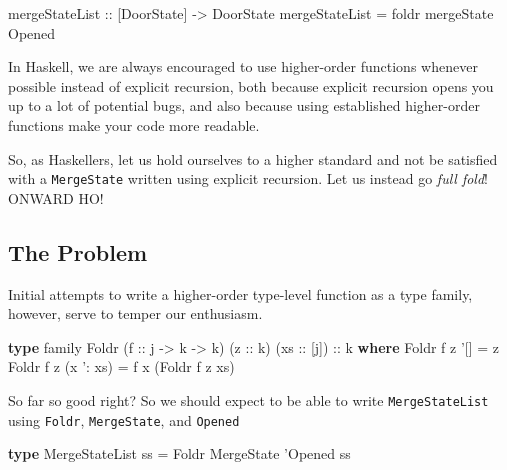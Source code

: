 \documentclass[]{article}
\newenvironment{Shaded}{}{}
\newcommand{\DataTypeTok}[1]{\textcolor[rgb]{0.56,0.13,0.00}{#1}}
\newcommand{\FunctionTok}[1]{\textcolor[rgb]{0.02,0.16,0.49}{#1}}
\newcommand{\KeywordTok}[1]{\textcolor[rgb]{0.00,0.44,0.13}{\textbf{#1}}}
\newcommand{\NormalTok}[1]{#1}
\newcommand{\OtherTok}[1]{\textcolor[rgb]{0.00,0.44,0.13}{#1}}
\begin{document}
\begin{Shaded}
\begin{Highlighting}[]
\OtherTok{mergeStateList ::}\NormalTok{ [}\DataTypeTok{DoorState}\NormalTok{] }\OtherTok{->} \DataTypeTok{DoorState}
\NormalTok{mergeStateList }\FunctionTok{=}\NormalTok{ foldr mergeState }\DataTypeTok{Opened}
\end{Highlighting}
\end{Shaded}

In Haskell, we are always encouraged to use higher-order functions whenever
possible instead of explicit recursion, both because explicit recursion opens
you up to a lot of potential bugs, and also because using established
higher-order functions make your code more readable.

So, as Haskellers, let us hold ourselves to a higher standard and not be
satisfied with a \texttt{MergeState} written using explicit recursion. Let us
instead go \emph{full fold}! ONWARD HO!

\hypertarget{the-problem}{%
\subsection{The Problem}\label{the-problem}}

Initial attempts to write a higher-order type-level function as a type family,
however, serve to temper our enthusiasm.

\begin{Shaded}
\begin{Highlighting}[]
\KeywordTok{type}\NormalTok{ family }\DataTypeTok{Foldr}\NormalTok{ (}\OtherTok{f ::}\NormalTok{ j }\OtherTok{->}\NormalTok{ k }\OtherTok{->}\NormalTok{ k) (}\OtherTok{z ::}\NormalTok{ k) (}\OtherTok{xs ::}\NormalTok{ [j])}\OtherTok{ ::}\NormalTok{ k }\KeywordTok{where}
    \DataTypeTok{Foldr}\NormalTok{ f z '[]       }\FunctionTok{=}\NormalTok{ z}
    \DataTypeTok{Foldr}\NormalTok{ f z (x '}\FunctionTok{:}\NormalTok{ xs) }\FunctionTok{=}\NormalTok{ f x (}\DataTypeTok{Foldr}\NormalTok{ f z xs)}
\end{Highlighting}
\end{Shaded}

So far so good right? So we should expect to be able to write
\texttt{MergeStateList} using \texttt{Foldr}, \texttt{MergeState}, and
\texttt{\textquotesingle{}Opened}

\begin{Shaded}
\begin{Highlighting}[]
\KeywordTok{type} \DataTypeTok{MergeStateList}\NormalTok{ ss }\FunctionTok{=} \DataTypeTok{Foldr} \DataTypeTok{MergeState}\NormalTok{ '}\DataTypeTok{Opened}\NormalTok{ ss}
\end{Highlighting}
\end{Shaded}
\end{document}
